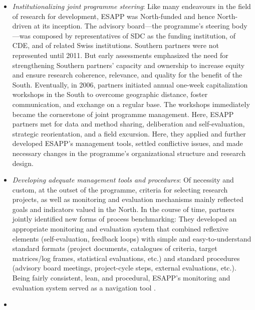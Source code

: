 \documentclass[10pt,a4paper]{article}
\begin{document}
\begin{multicols}{2}
\begin{itemize}
\item \textit{Institutionalizing joint programme steering}: Like many endeavours in the field of research for development, ESAPP was North-funded and hence North-driven at its inception. The advisory board---the programme's steering body---was composed by representatives of SDC as the funding institution, of CDE, and of related Swiss institutions. Southern partners were not represented until 2011. But early assessments emphasized the need for strengthening Southern partners' capacity and ownership to increase equity and ensure research coherence, relevance, and quality for the benefit of the South. Eventually, in 2006, partners initiated annual one-week capitalization workshops in the South to overcome geographic distance, foster communication, and exchange on a regular base. The workshops immediately became the cornerstone of joint programme management. Here, ESAPP partners met for data and method sharing, deliberation and self-evaluation, strategic reorientation, and a field excursion. Here, they applied and further developed ESAPP's management tools, settled conflictive issues, and made necessary changes in the programme's organizational structure and research design.
\item \textit{Developing adequate management tools and procedures}: Of necessity and custom, at the outset of the programme, criteria for selecting research projects, as well as monitoring and evaluation mechanisms mainly reflected goals and indicators valued in the North. In the course of time, partners jointly identified new forms of process benchmarking: They developed an appropriate monitoring and evaluation system that combined reflexive elements (self-evaluation, feedback loops) with simple and easy-to-understand standard formats (project documents, catalogues of criteria, target matrices/log frames, statistical evaluations, etc.) and standard procedures (advisory board meetings, project-cycle steps, external evaluations, etc.). Being fairly consistent, lean, and procedural, ESAPP's monitoring and evaluation system served as a navigation tool \citep{r45}.
\item {}

\end{itemize}
\end{multicols}
\end{document}
